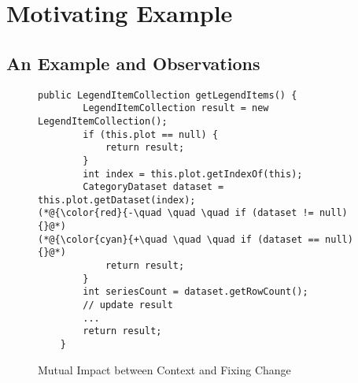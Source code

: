 \section{Motivating Example}
\label{motiv:sec}

\subsection{An Example and Observations}

\begin{figure}[t]
	\centering
	\begin{lstlisting}[]
    public LegendItemCollection getLegendItems() {
        LegendItemCollection result = new LegendItemCollection();
        if (this.plot == null) {
            return result;
        }
        int index = this.plot.getIndexOf(this);
        CategoryDataset dataset = this.plot.getDataset(index);
(*@{\color{red}{-\quad \quad \quad if (dataset != null) {}@*)
(*@{\color{cyan}{+\quad \quad \quad if (dataset == null) {}@*)
            return result;
        }
        int seriesCount = dataset.getRowCount();
        // update result
        ...
        return result;
    }
	\end{lstlisting}
        \vspace{-15pt}
        \caption{Mutual Impact between Context and Fixing Change}
        \vspace{-8pt}
        \label{fig:motiv}
\end{figure}



